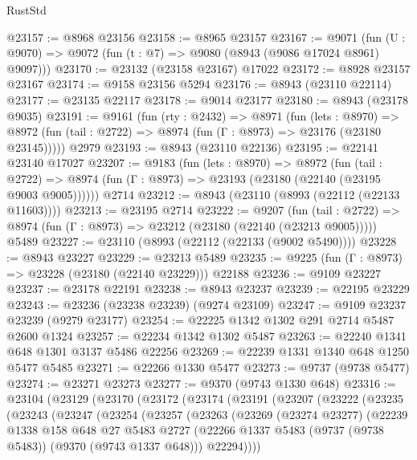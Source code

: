 \begin{lexlean}{RustStd}
\begin{coremodule}
@23157 := @8968 @23156
@23158 := @8965 @23157
@23167 := @9071
    (fun (U : @9070) => @9072 (fun (t : @7) => @9080 (@8943 (@9086 @17024 @8961) @9097)))
@23170 := @23132 (@23158 @23167) @17022
@23172 := @8928 @23157 @23167
@23174 := @9158 @23156 @5294
@23176 := @8943 (@23110 @22114)
@23177 := @23135 @22117
@23178 := @9014 @23177
@23180 := @8943 (@23178 @9035)
@23191 := @9161
    (fun (rty : @2432) =>
    @8971
      (fun (lets : @8970) =>
      @8972 (fun (tail : @2722) => @8974 (fun (Γ : @8973) => @23176 (@23180 @23145)))))
    @2979
@23193 := @8943 (@23110 @22136)
@23195 := @22141 @23140 @17027
@23207 := @9183
    (fun (lets : @8970) =>
    @8972
      (fun (tail : @2722) =>
      @8974 (fun (Γ : @8973) => @23193 (@23180 (@22140 (@23195 @9003 @9005))))))
    @2714
@23212 := @8943 (@23110 (@8993 (@22112 (@22133 @11603))))
@23213 := @23195 @2714
@23222 := @9207
    (fun (tail : @2722) => @8974 (fun (Γ : @8973) => @23212 (@23180 (@22140 (@23213 @9005)))))
    @5489
@23227 := @23110 (@8993 (@22112 (@22133 (@9002 @5490))))
@23228 := @8943 @23227
@23229 := @23213 @5489
@23235 := @9225 (fun (Γ : @8973) => @23228 (@23180 (@22140 @23229))) @22188
@23236 := @9109 @23227
@23237 := @23178 @22191
@23238 := @8943 @23237
@23239 := @22195 @23229
@23243 := @23236 (@23238 @23239) (@9274 @23109)
@23247 := @9109 @23237 @23239 (@9279 @23177)
@23254 := @22225 @1342 @1302 @291 @2714 @5487 @2600 @1324
@23257 := @22234 @1342 @1302 @5487
@23263 := @22240 @1341 @648 @1301 @3137 @5486 @22256
@23269 := @22239 @1331 @1340 @648 @1250 @5477 @5485
@23271 := @22266 @1330 @5477
@23273 := @9737 (@9738 @5477)
@23274 := @23271 @23273
@23277 := @9370 (@9743 @1330 @648)
@23316 := @23104
    (@23129
      (@23170
        (@23172
          (@23174
            (@23191
              (@23207
                (@23222
                  (@23235
                    (@23243
                      (@23247
                        (@23254
                          (@23257
                            (@23263
                              (@23269
                                (@23274 @23277)
                                (@22239
                                  @1338
                                  @158
                                  @648
                                  @27
                                  @5483
                                  @2727
                                  (@22266
                                    @1337
                                    @5483
                                    (@9737 (@9738 @5483))
                                    (@9370 (@9743 @1337 @648)))
                                  @22294))))

\end{coremodule}
\end{lexlean}
